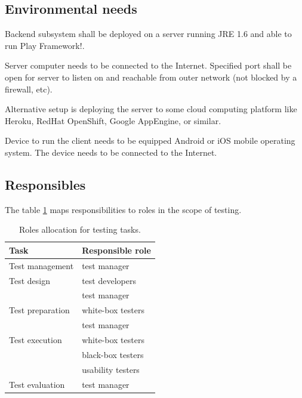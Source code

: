 \documentclass[11pt]{book}
\begin{document}
\subsection{Environmental needs}
Backend subsystem shall be deployed on a server running JRE 1.6 and able to run Play Framework!.

Server computer needs to be connected to the Internet. Specified port shall be open for server to listen on and reachable from outer network (not blocked by a firewall, etc).

Alternative setup is deploying the server to some cloud computing platform like Heroku, RedHat OpenShift, Google AppEngine, or similar. 

Device to run the client needs to be equipped Android or iOS mobile operating system. The device needs to be connected to the Internet.

\subsection{Responsibles}

The table \ref{tab:test_plan_tasks_allocation} maps responsibilities to roles in the scope of testing.

\begin{table}[H]
    \centering
    \begin{tabular}{| l | l |}
        \hline
        Task                & Responsible role              \\ \hline

        Test management     & test manager                  \\ \hline
        
        Test design         & test developers               \\
                            & test manager                  \\ \hline
        
        Test preparation    & white-box testers             \\
                            & test manager                  \\ \hline
        
        Test execution      & white-box testers             \\
                            & black-box testers             \\
                            & usability testers             \\ \hline
        
        Test evaluation     & test manager                  \\ \hline
    \end{tabular}
    \label{tab:test_plan_tasks_allocation}
    \caption{Roles allocation for testing tasks.}
\end{table}
\end{document}
